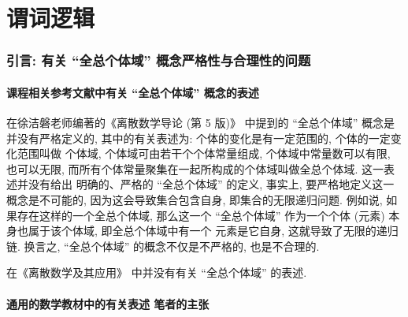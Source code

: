 \documentclass[10pt,UTF8]{ctexbook} %
\begin{document}
\newpage
\thispagestyle{empty}

\chapter{谓词逻辑}

\subsection*{引言: 有关 “全总个体域” 概念严格性与合理性的问题}
\setcounter{subsubsection}{0}
\subsubsection{课程相关参考文献中有关 “全总个体域” 概念的表述}

在徐洁磐老师编著的《离散数学导论 (第 5 版)》 \cite{徐洁磐} 中提到的 “全总个体域” 概念是并没有严格定义的,
其中的有关表述为: {\kaishu 个体的变化是有一定范围的, 个体的一定变化范围叫做
个体域, 个体域可由若干个个体常量组成, 个体域中常量数可以有限, 也可以无限,
而所有个体常量聚集在一起所构成的个体域叫做全总个体域}. 这一表述并没有给出
明确的、严格的 “全总个体域” 的定义, 事实上, 要严格地定义这一概念是不可能的,
因为这会导致集合包含自身, 即集合的无限递归问题. 例如说, 如果存在这样的一个全总个体域,
那么这一个 “全总个体域” 作为一个个体 (元素) 本身也属于该个体域, 即全总个体域中有一个
元素是它自身, 这就导致了无限的递归链. 
换言之, “全总个体域” 的概念不仅是不严格的, 也是不合理的.

在《离散数学及其应用》\cite{离散数学及其应用} 中并没有有关 “全总个体域” 的表述.

\subsubsection{通用的数学教材中的有关表述 \quad 笔者的主张}
\end{document}
